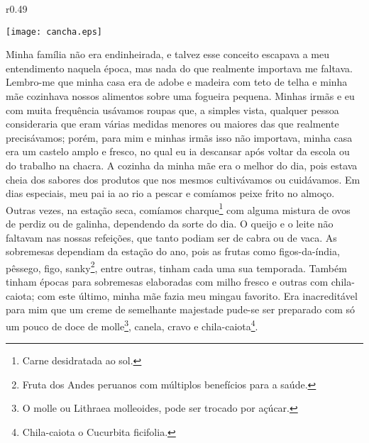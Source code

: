 \ifdefined\EnableIncludeImages
\begin{wrapfigure}{r}{0.49\textwidth}
  \begin{center}
  \vspace{-20pt}
    \texttt{[image: cancha.eps]}
  \end{center}
  \vspace{-20pt}
\end{wrapfigure}
\fi
Minha família não era endinheirada, e talvez esse conceito escapava a meu entendimento naquela época, mas nada do que realmente importava me faltava.
Lembro-me que minha casa era de adobe e madeira com teto de telha e minha mãe cozinhava nossos alimentos sobre uma fogueira pequena. Minhas irmãs e eu com muita frequência usávamos roupas que, a simples vista, qualquer pessoa consideraria que eram várias medidas menores ou maiores das que realmente precisávamos;
porém, para mim e minhas irmãs isso não importava, minha casa era um castelo amplo e fresco, no qual eu ia descansar após voltar da escola ou do trabalho na chacra. 
A cozinha da minha mãe era o melhor do dia, pois estava cheia dos sabores dos produtos que nos mesmos cultivávamos ou cuidávamos. 
Em dias especiais, meu pai ia ao rio a pescar e comíamos peixe frito no almoço. Outras vezes, na estação seca, comíamos charque\footnote{Carne desidratada ao sol.} com alguma mistura de ovos de perdiz ou de galinha, dependendo da sorte do dia.
O queijo e o leite não faltavam nas nossas refeições, que tanto podiam ser de cabra ou de vaca.
As sobremesas dependiam da estação do ano, pois as frutas como figos-da-índia, pêssego, figo, sanky\footnote{Fruta dos Andes peruanos com múltiplos benefícios para a saúde.}, entre outras, tinham cada uma sua temporada. Também tinham épocas para sobremesas elaboradas com milho fresco e outras com chila-caiota; com este último, minha mãe fazia meu mingau favorito. Era inacreditável para mim que um creme de semelhante majestade pude-se ser preparado com só um pouco de doce de molle\footnote{O molle ou Lithraea molleoides, pode ser trocado por açúcar.}, canela, cravo e chila-caiota\footnote{Chila-caiota o Cucurbita ficifolia.}.

